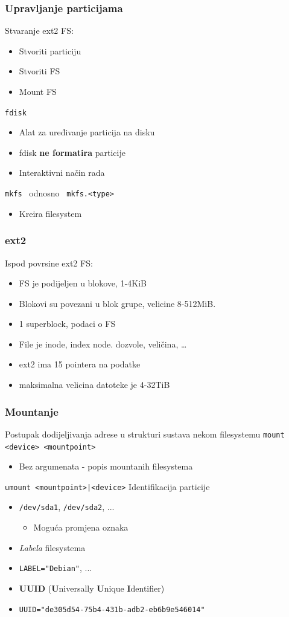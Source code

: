 \documentclass[t]{beamer}
\begin{document}
\begin{frame}[fragile]
	\frametitle{Upravljanje particijama}
    Stvaranje ext2 FS:
    \begin{itemize}
        \item Stvoriti particiju
        \item Stvoriti FS
        \item Mount FS
    \end{itemize}
	\vfill
	\texttt{fdisk}
	\begin{itemize}
		\item Alat za uređivanje particija na disku
		\item fdisk \textbf{ne formatira} particije
		\item Interaktivni način rada
	\end{itemize}
	\vfill
	\texttt{mkfs} \, odnosno \, \verb|mkfs.<type>|
	\begin{itemize}
		\item Kreira filesystem
	\end{itemize}
\end{frame}


\begin{frame}
	\frametitle{ext2}
    Ispod povrsine ext2 FS:

    \begin{itemize}
        \item FS je podijeljen u blokove, 1-4KiB
        \item Blokovi su povezani u blok grupe, velicine 8-512MiB. 
        \item 1 superblock, podaci o FS
        \item File je inode, index node. dozvole, veličina, \ldots
        \item ext2 ima 15 pointera na podatke
        \item maksimalna velicina datoteke je 4-32TiB
    \end{itemize}
\end{frame}

\begin{frame}[fragile]
	\frametitle{Mountanje}
	Postupak dodijeljivanja adrese u strukturi sustava nekom filesystemu
	\vfill
	\verb|mount <device> <mountpoint>|
	\begin{itemize}
		\item Bez argumenata - popis mountanih filesystema
	\end{itemize}
	\verb/umount <mountpoint>|<device>/
	\vfill
	Identifikacija particije
	\begin{itemize}
		\item \verb|/dev/sda1|, \verb|/dev/sda2|, ...
		\begin{itemize}
			\item Moguća promjena oznaka
		\end{itemize}
		\item \textit{Labela} filesystema
		\item[] \verb|LABEL="Debian"|, ...
		\item \textbf{UUID} (\textbf{U}niversally \textbf{U}nique \textbf{I}dentifier)
		\item[] \verb|UUID="de305d54-75b4-431b-adb2-eb6b9e546014"|
	\end{itemize}
\end{frame}
\end{document}
